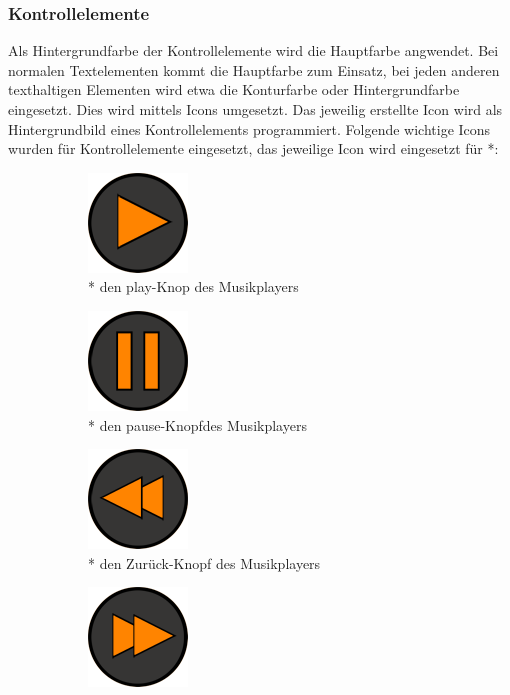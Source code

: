 \documentclass[FIPLY_base.tex]{subfiles}
\begin{document}
	\subsubsection{Kontrollelemente}
	Als Hintergrundfarbe der Kontrollelemente wird die Hauptfarbe angwendet. Bei normalen Textelementen kommt die Hauptfarbe zum Einsatz, bei jeden anderen texthaltigen Elementen wird etwa die Konturfarbe oder Hintergrundfarbe eingesetzt. Dies wird mittels Icons umgesetzt. Das jeweilig erstellte Icon wird als Hintergrundbild eines Kontrollelements programmiert. Folgende wichtige Icons wurden für Kontrollelemente eingesetzt, das jeweilige Icon wird eingesetzt für *:
	\begin{figure}[H]
		\begin{subfigure}[b]{0.2\textwidth}
			\includegraphics[scale=0.4]{img/icons/play}
			\caption{* den play-Knop des Musikplayers}
		\end{subfigure}
		\hfil
		\begin{subfigure}[b]{0.2\textwidth}
			\includegraphics[scale=0.4]{img/icons/pause}
			\caption{* den pause-Knopfdes Musikplayers}
		\end{subfigure}
		\hfil
		\begin{subfigure}[b]{0.2\textwidth}
			\includegraphics[scale=0.4]{img/icons/last}
			\caption{* den Zurück-Knopf des Musikplayers}
		\end{subfigure}
		\hfil
		\begin{subfigure}[b]{0.2\textwidth}
			\includegraphics[scale=0.4]{img/icons/next}

\end{subfigure}
\end{figure}
\end{document}
